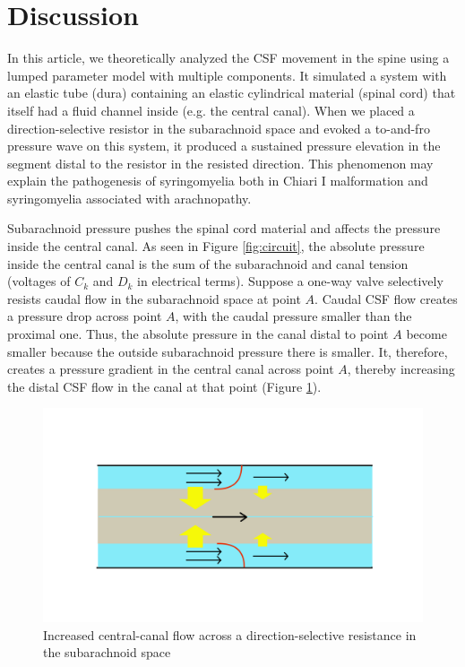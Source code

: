 \documentclass[fleqn,10pt]{wlscirep}
\begin{document}
\section*{Discussion}

In this article, we theoretically analyzed the CSF movement in the spine
using a lumped parameter model with multiple components. It simulated a
system with an elastic tube (dura) containing an elastic cylindrical
material (spinal cord) that itself had a fluid channel inside (e.g. the
central canal). When we placed a direction-selective resistor in the
subarachnoid space and evoked a to-and-fro pressure wave on this system, it
produced a sustained pressure elevation in the segment distal to the
resistor in the resisted direction. This phenomenon may explain the
pathogenesis of syringomyelia both in Chiari I malformation and
syringomyelia associated with arachnopathy.

Subarachnoid pressure pushes the spinal cord material and affects the
pressure inside the central canal. As seen in Figure \ref{fig:circuit}, the
absolute pressure inside the central canal is the sum of the subarachnoid
and canal tension (voltages of $C_k$ and $D_k$ in electrical terms).
Suppose a one-way valve selectively resists caudal flow in the subarachnoid
space at point $A$. Caudal CSF flow creates a pressure drop across point
$A$, with the caudal pressure smaller than the proximal one. Thus, the
absolute pressure in the canal distal to point $A$ become smaller because
the outside subarachnoid pressure there is smaller. It, therefore, creates
a pressure gradient in the central canal across point $A$, thereby
increasing the distal CSF flow in the canal at that point (Figure
\ref{fig:pump_close}).

\begin{figure}[hbt]
    \centering
    \includegraphics[width=\textwidth]{pumping_mechanism_close.jpg}
    \caption{Increased central-canal flow across a direction-selective
    resistance in the subarachnoid space}
    \label{fig:pump_close}
\end{figure}
\end{document}
